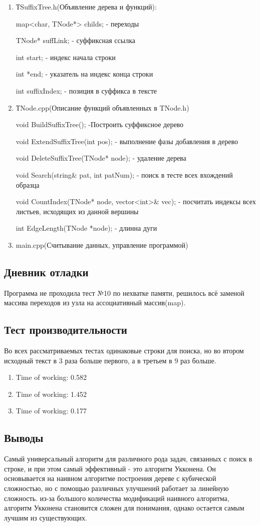 \documentclass[12pt]{article}
\begin{document}
\begin{enumerate}
\item ТSuffixTree.h(Объявление дерева и функций):
\par map<char, TNode*> childs; - переходы
\par TNode* suffLink; - суффиксная ссылка
\par int start; - индекс начала строки
\par int *end; - указатель на индекс конца строки
\par int suffixIndex; - позиция в суффикса в тексте
\item ТNode.cpp(Описание функций объявленных в TNode.h)
\par void BuildSuffixTree(); -Построить суффиксное дерево
\par void ExtendSuffixTree(int pos); - выполнение фазы добавления в дерево
\par void DeleteSuffixTree(TNode* node); - удаление дерева
\par void Search(string\& pat, int patNum); - поиск в тесте всех вхождений образца
\par void CountIndex(TNode* node, vector<int>\& vec); - посчитать индексы всех листьев, исходящих из данной вершины
\par int EdgeLength(TNode *node); - длинна дуги
\item main.cpp(Считывание данных, управление программой)
\end{enumerate}

\subsection*{Дневник отладки}

Программа не проходила тест №10 по нехватке памяти, решилось всё заменой массива переходов из узла на ассоциативный массив(map). 

\subsection*{Тест производительности}
Во всех рассматриваемых тестах одинаковые строки для поиска, но во втором исходный текст в 3 раза больше первого, а в третьем в 9 раз больше.
\begin{enumerate}
	\item Time of working: 0.582
	\item Time of working: 1.452
	\item Time of working: 0.177
	
\end{enumerate}
\subsection*{Выводы}
Самый универсальный алгоритм для различного рода задач, связанных с поиск в строке, и при этом самый эффективный - это алгоритм Укконена. Он основывается на наивном алгоритме построения дереве с кубической сложностью, но с помощью различных улучшений работает за линейную сложность. из-за большого количества модификаций наивного алгоритма, алгоритм Укконена становится сложен для понимания, однако остается самым лучшим из существующих.
\end{document}
